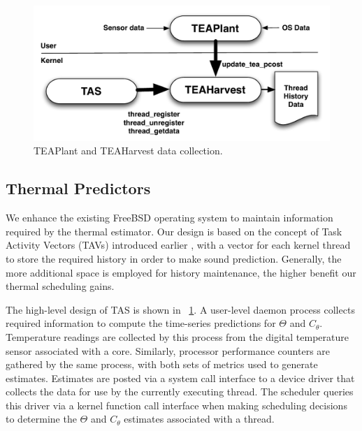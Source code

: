 \documentclass[times, 10pt,twocolumn]{IEEEtran}
\begin{document}
\newline
\begin{figure}[btph] \centering
  \includegraphics[scale=0.45]{tasdesign}
  \caption{TEAPlant and TEAHarvest data collection.}
  \label{fig:teaplant}
\end{figure}

\subsection{Thermal Predictors}
\label{sec:therm-pred-design} 
We enhance the existing FreeBSD operating system to maintain information
required by the thermal estimator. Our design is based on the concept of
Task Activity Vectors (TAVs) introduced earlier \cite{Merkel2008a},
with a vector for each kernel thread to store the required history in order to make
sound prediction.  Generally, the more additional space is employed
for history maintenance, the higher benefit our thermal scheduling gains.

The high-level design of TAS is shown in \figurename~\ref{fig:teaplant}.
A user-level daemon process collects required information to compute
the time-series predictions for $\Theta$ and $C_{\theta}$. Temperature
readings are collected by this process from the digital temperature
sensor associated with a core.  Similarly, processor performance
counters are gathered by the same process, with both sets of metrics
used to generate estimates. Estimates are posted via a system call
interface to a device driver that collects the data for use by
the currently executing thread.  The scheduler queries this
driver via a kernel function call interface when making scheduling
decisions to determine the $\Theta$ and $C_{\theta}$ estimates
associated with a thread.
\end{document}
